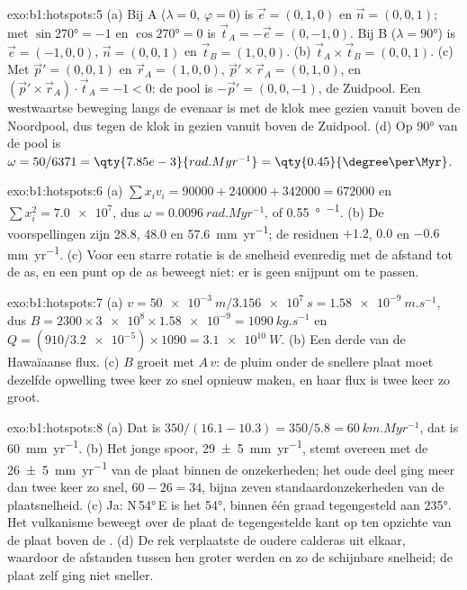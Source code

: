 \begin{solution}{exo:b1:hotspots:5}
(a) Bij A ($\lambda = 0$, $\varphi = 0$) is $\vec e = (0, 1, 0)$ en
$\vec n = (0, 0, 1)$; met $\sin\ang{270} = -1$ en $\cos\ang{270} = 0$ is
$\vec t_A = -\vec e = (0, -1, 0)$. Bij B ($\lambda = \ang{90}$) is
$\vec e = (-1, 0, 0)$, $\vec n = (0, 0, 1)$ en $\vec t_B = (1, 0, 0)$.
(b) $\vec t_A\times\vec t_B = (0, 0, 1)$. (c) Met $\vec p' = (0, 0, 1)$ en
$\vec r_A = (1, 0, 0)$, $\vec p'\times\vec r_A = (0, 1, 0)$, en
$(\vec p'\times\vec r_A)\cdot\vec t_A = -1 < 0$: de pool is
$-\vec p' = (0, 0, -1)$, de Zuidpool. Een westwaartse beweging langs de evenaar
is met de klok mee gezien vanuit boven de Noordpool, dus tegen de klok in gezien vanuit boven de Zuidpool.
(d) Op \ang{90} van de pool is $\omega = 50/6371 =
\qty{7.85e-3}{rad.Myr^{-1}} = \qty{0.45}{\degree\per\Myr}$.
\end{solution}

\begin{solution}{exo:b1:hotspots:6}
(a) $\sum x_i v_i = 90000 + 240000 + 342000 = \num{672000}$ en
$\sum x_i^2 = \num{7.0e7}$, dus $\omega = \qty{0.0096}{rad.Myr^{-1}}$, of
\qty{0.55}{\degree\per\Myr}. (b) De voorspellingen zijn 28.8, 48.0 en
\qty{57.6}{mm.yr^{-1}}; de residuen $+1.2$, $0.0$ en $-0.6$
\unit{mm.yr^{-1}}. (c) Voor een starre rotatie is de snelheid evenredig met de
afstand tot de as, en een punt op de as beweegt niet: er is geen snijpunt om te passen.
\end{solution}

\begin{solution}{exo:b1:hotspots:7}
(a) $v = \qty{50e-3}{m}/\qty{3.156e7}{s} = \qty{1.58e-9}{m.s^{-1}}$, dus
$B = 2300\times\num{3e8}\times\num{1.58e-9} = \qty{1090}{kg.s^{-1}}$ en
$Q = (910/\num{3.2e-5})\times1090 = \qty{3.1e10}{W}$. (b) Een derde van de
Hawaïaanse flux. (c) $B$ groeit met $A\,v$: de pluim onder de snellere plaat
moet dezelfde opwelling twee keer zo snel opnieuw maken, en haar flux is twee keer zo groot.
\end{solution}

\begin{solution}{exo:b1:hotspots:8}
(a) Dat is $350/(16.1 - 10.3) = 350/5.8 = \qty{60}{km.Myr^{-1}}$, dat is
\qty{60}{mm.yr^{-1}}. (b) Het jonge spoor, \qty{29 \pm 5}{mm.yr^{-1}}, stemt
overeen met de \qty{26 \pm 5}{mm.yr^{-1}} van de plaat binnen de onzekerheden; het
oude deel ging meer dan twee keer zo snel, $60 - 26 = 34$, bijna zeven
standaardonzekerheden van de plaatsnelheid. (c) Ja: N\,\ang{54}\,E is het 
\ang{54}, binnen één graad tegengesteld aan \ang{235}. Het vulkanisme beweegt over de
plaat de tegengestelde kant op ten opzichte van de plaat boven de . (d) De rek verplaatste de
oudere calderas uit elkaar, waardoor de afstanden tussen hen groter werden en zo de
schijnbare snelheid; de plaat zelf ging niet sneller.
\end{solution}

